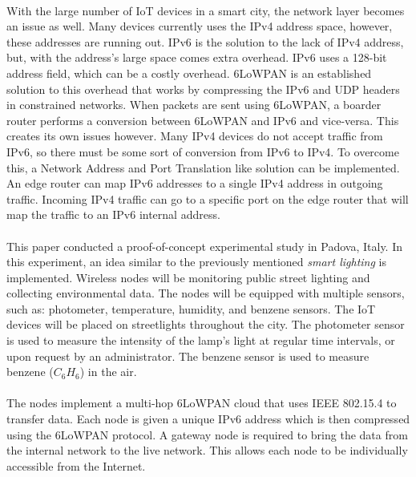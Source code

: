\documentclass[a4paper,12pt]{article}
\begin{document}
\paragraph{}
With the large number of IoT devices in a smart city, the network layer becomes an issue as well. Many devices currently uses the IPv4 address space, however, these addresses are running out. IPv6 is the solution to the lack of IPv4 address, but, with the address's large space comes extra overhead. IPv6 uses a 128-bit address field, which can be a costly overhead. 6LoWPAN is an established solution to this overhead that works by compressing the IPv6 and UDP headers in constrained networks. When packets are sent using 6LoWPAN, a boarder router performs a conversion between 6LoWPAN and IPv6 and vice-versa. This creates its own issues however. Many IPv4 devices do not accept traffic from IPv6, so there must be some sort of conversion from IPv6 to IPv4. To overcome this, a Network Address and Port Translation like solution can be implemented. An edge router can map IPv6 addresses to a single IPv4 address in outgoing traffic. Incoming IPv4 traffic can go to a specific port on the edge router that will map the traffic to an IPv6 internal address.
\paragraph{}
This paper conducted a proof-of-concept experimental study in Padova, Italy. In this experiment, an idea similar to the previously mentioned \textit{smart lighting} is implemented. Wireless nodes will be monitoring public street lighting and collecting environmental data. The nodes will be equipped with multiple sensors, such as: photometer, temperature, humidity, and benzene sensors. The IoT devices will be placed on streetlights throughout the city. The photometer sensor is used to measure the intensity of the lamp's light at regular time intervals, or upon request by an administrator. The benzene sensor is used to measure benzene ($C_6H_6$) in the air. 
\paragraph{}
The nodes implement a multi-hop 6LoWPAN cloud that uses IEEE 802.15.4 to transfer data. Each node is given a unique IPv6 address which is then compressed using the 6LoWPAN protocol. A gateway node is required to bring the data from the internal network to the live network. This allows each node to be individually accessible from the Internet.
\end{document}

